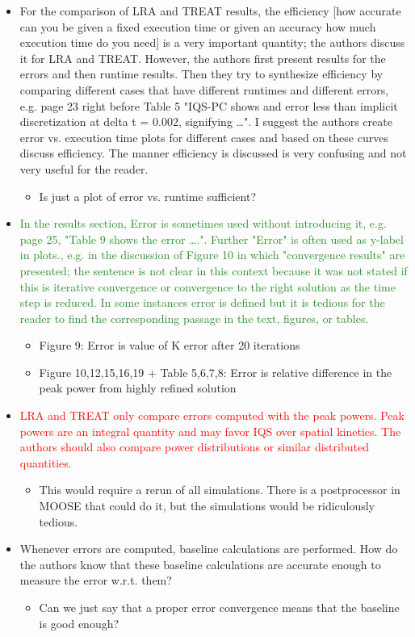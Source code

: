 \documentclass{elsarticle}
\newcommand{\fix}{\textsquare}
\newcommand{\easy}[1]{\textcolor{ForestGreen}{#1}}
\newcommand{\medm}[1]{\textcolor{BurntOrange}{#1}}
\newcommand{\hard}[1]{\textcolor{Red}{#1}}
\begin{document}
\begin{itemize}
\item[\fix] \medm{ For the comparison of LRA and TREAT results, the efficiency [how accurate can you be given a fixed execution time or given an accuracy how much execution time do you need] is a very important quantity; the authors discuss it for LRA and TREAT. However, the authors first present results for the errors and then runtime results. Then they try to synthesize efficiency by comparing different cases that have different runtimes and different errors, e.g. page 23 right before Table 5 "IQS-PC shows and error less than implicit discretization at delta t = 0.002, signifying …". I suggest the authors create error vs. execution time plots for different cases and based on these curves discuss efficiency. The manner efficiency is discussed is very confusing and not very useful for the reader. }
\begin{itemize}
\item Is just a plot of error vs. runtime sufficient?
\end{itemize}

\item[\fix] \easy{ In the results section, Error is sometimes used without introducing it, e.g. page 25, "Table 9 shows the error ….". Further "Error" is often used as y-label in plots., e.g. in the discussion of Figure 10 in which "convergence results" are presented; the sentence is not clear in this context because it was not stated if this is iterative convergence or convergence to the right solution as the time step is reduced. In some instances error is defined but it is tedious for the reader to find the corresponding passage in the text, figures, or tables. }
\begin{itemize}
\item Figure 9: Error is value of K error after 20 iterations
\item Figure 10,12,15,16,19 + Table 5,6,7,8: Error is relative difference in the peak power from highly refined solution
\end{itemize}

\item[\fix] \hard{ LRA and TREAT only compare errors computed with the peak powers. Peak powers are an integral quantity and may favor IQS over spatial kinetics. The authors should also compare power distributions or similar distributed quantities. }
\begin{itemize}
\item This would require a rerun of all simulations. There is a postprocessor in MOOSE that could do it, but the simulations would be ridiculously tedious.
\end{itemize}

\item[\fix] \medm{  Whenever errors are computed, baseline calculations are performed. How do the authors know that these baseline calculations are accurate enough to measure the error w.r.t. them? }
\begin{itemize}
\item Can we just say that a proper error convergence means that the baseline is good enough?
\end{itemize}

\end{itemize}
\end{document}

